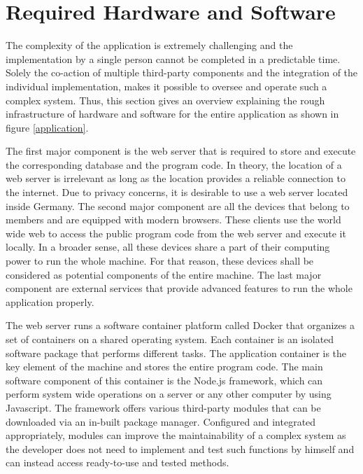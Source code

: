 \documentclass[12pt,numbers=noenddot,parskip,bibliography=totocnumbered,listof=totocnumbered,draft]{scrreprt}
\begin{document}
\section{Required Hardware and Software}
The complexity of the application is extremely challenging and the implementation by a single person cannot be completed in a predictable time. Solely the co-action of multiple third-party components and the integration of the individual implementation, makes it possible to oversee and operate such a complex system. Thus, this section gives an overview explaining the rough infrastructure of hardware and software for the entire application as shown in figure \ref{application}.

The first major component is the web server that is required to store and execute the corresponding database and the program code. In theory, the location of a web server is irrelevant as long as the location provides a reliable connection to the internet. Due to privacy concerns, it is desirable to use a web server located inside Germany. The second major component are all the devices that belong to members and are equipped with modern browsers. These clients use the world wide web to access the public program code from the web server and execute it locally. In a broader sense, all these devices share a part of their computing power to run the whole machine. For that reason, these devices shall be considered as potential components of the entire machine. The last major component are external services that provide advanced features to run the whole application properly.

The web server runs a software container platform called \mbox{Docker} \citep{docker} that organizes a set of containers on a shared operating system. Each container is an isolated software package that performs different tasks. The application container is the key element of the machine and stores the entire program code. The main software component of this container is the \mbox{Node.js}\citep{nodejs} framework, which can perform system wide operations on a server or any other computer by using Javascript. The framework offers various third-party modules that can be downloaded via an in-built package manager. Configured and integrated appropriately, modules can improve the maintainability of a complex system as the developer does not need to implement and test such functions by himself and can instead access ready-to-use and tested methods. 
\end{document}
